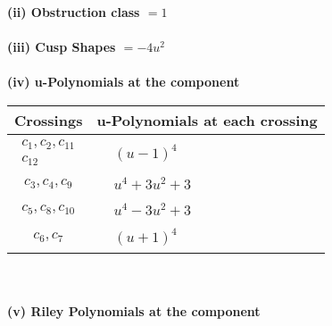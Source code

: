 \documentclass[1p]{elsarticle_modified}
\theoremstyle{definition}
\begin{document}
\flushleft \textbf{(ii) Obstruction class $= 1$}\\~\\
\flushleft \textbf{(iii) Cusp Shapes $= -4 u^2$}\\~\\
\newpage\renewcommand{\arraystretch}{1}
\flushleft \textbf{(iv) u-Polynomials at the component}\newline \\
\begin{tabular}{m{50pt}|m{274pt}}
Crossings & \hspace{64pt}u-Polynomials at each crossing \\
\hline $$\begin{aligned}c_{1},c_{2},c_{11}\\c_{12}\end{aligned}$$&$\begin{aligned}
&(u-1)^4
\end{aligned}$\\
\hline $$\begin{aligned}c_{3},c_{4},c_{9}\end{aligned}$$&$\begin{aligned}
&u^4+3 u^2+3
\end{aligned}$\\
\hline $$\begin{aligned}c_{5},c_{8},c_{10}\end{aligned}$$&$\begin{aligned}
&u^4-3 u^2+3
\end{aligned}$\\
\hline $$\begin{aligned}c_{6},c_{7}\end{aligned}$$&$\begin{aligned}
&(u+1)^4
\end{aligned}$\\
\hline
\end{tabular}\\~\\
\newpage\renewcommand{\arraystretch}{1}
\flushleft \textbf{(v) Riley Polynomials at the component}\newline \\
\end{document}
